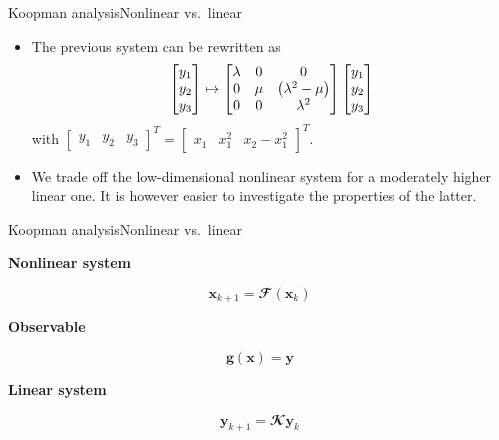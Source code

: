\documentclass[usenames,dvipsnames,svgnames,10pt,aspectratio=169]{beamer}
\begin{document}
\begin{frame}[t, c]{Koopman analysis}{Nonlinear vs.\ linear}
	\begin{itemize}
		\item The previous system can be rewritten as
		\begin{equation}
			\begin{bmatrix} y_1 \\ y_2 \\ y_3 \end{bmatrix} \mapsto \begin{bmatrix} \lambda & 0 & 0 \\ 0 & \mu & \left( \lambda^2 - \mu \right) \\ 0 & 0 & \lambda^2 \end{bmatrix} \begin{bmatrix} y_1 \\ y_2 \\ y_3 \end{bmatrix}
			\notag
		\end{equation}
		with $\begin{bmatrix} y_1 & y_2 & y_3 \end{bmatrix}^T = \begin{bmatrix} x_1 & x_1^2 & x_2 - x_1^2 \end{bmatrix}^T$.

		\bigskip

		\item We trade off the low-dimensional nonlinear system for a moderately higher linear one. It is however easier to investigate the properties of the latter.
	\end{itemize}

	\vspace{1cm}
\end{frame}

\begin{frame}[t, c]{Koopman analysis}{Nonlinear vs.\ linear}
	\begin{minipage}{.32\textwidth}
		\centering
		\textbf{Nonlinear system}

		$$\mathbf{x}_{k+1} = \mathbfcal{F} \left( \mathbf{x}_k \right)$$
	\end{minipage}%
	\hfill
	\begin{minipage}{.32\textwidth}
		\centering
		\textbf{Observable}

		$$\bm{g} \left( \mathbf{x} \right) = \mathbf{y}$$
	\end{minipage}%
	\hfill
	\begin{minipage}{.32\textwidth}
		\centering
		\textbf{Linear system}

		$$\mathbf{y}_{k+1} = \mathbfcal{K} \mathbf{y}_k$$
	\end{minipage}

	\vspace{1cm}
\end{frame}
\end{document}
